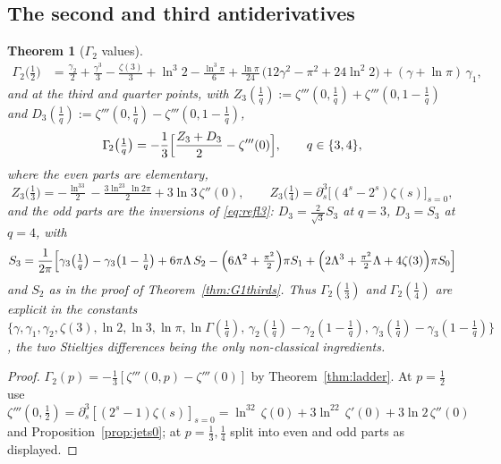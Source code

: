\documentclass[11pt]{article}
\newtheorem{theorem}{Theorem}[section]
\theoremstyle{remark}
\begin{document}
\subsection{The second and third antiderivatives}

\begin{theorem}[$\Gamma_{\!2}$ values]\label{thm:G2}
\begin{align*}
\Gamma_{\!2}\bigl(\tfrac12\bigr)
&=\frac{\gamma_{2}}{2}+\frac{\gamma^{3}}{3}-\frac{\zeta(3)}{3}+\ln ^{3}2
-\frac{\ln ^{3}\pi}{6}
+\frac{\ln \pi}{24}\,\bigl(12 \gamma^{2}-\pi^{2}+24 \ln ^{2}2\bigr)
+(\gamma+\ln \pi)\,\gamma_{1},
\end{align*}
and at the third and quarter points, with
$Z_3(\tfrac1q):=\zeta'''(0,\tfrac1q)+\zeta'''(0,1-\tfrac1q)$ and
$D_3(\tfrac1q):=\zeta'''(0,\tfrac1q)-\zeta'''(0,1-\tfrac1q)$,
\[
\Gamma_{\!2}\bigl(\tfrac1q\bigr)
=-\frac13\Bigl[\frac{Z_3+D_3}{2}-\zeta'''(0)\Bigr],
\qquad q\in\{3,4\},
\]
where the even parts are elementary,
\[
Z_3\bigl(\tfrac13\bigr)=-\tfrac{\ln^33}{2}-\tfrac{3\ln^23\,\ln2\pi}{2}+3\ln3\,\zeta''(0),
\qquad
Z_3\bigl(\tfrac14\bigr)=\partial_s^3\bigl[(4^s-2^s)\zeta(s)\bigr]_{s=0},
\]
and the odd parts are the inversions of \eqref{eq:refl3}:
$D_3=\frac{2}{\sqrt3}S_3$ at $q=3$, $D_3=S_3$ at $q=4$, with
\[
S_3=\frac{1}{2\pi}\Bigl[\gamma_3\bigl(\tfrac1q\bigr)-\gamma_3\bigl(1-\tfrac1q\bigr)
+6\pi \Lambda\,S_2-\Bigl(6\Lambda^2+\tfrac{\pi^2}{2}\Bigr)\pi S_1
+\Bigl(2\Lambda^3+\tfrac{\pi^2}{2}\Lambda+4\zeta(3)\Bigr)\pi S_0\Bigr]
\]
and $S_2$ as in the proof of Theorem~\ref{thm:G1thirds}. Thus
$\Gamma_{\!2}(\tfrac13)$ and $\Gamma_{\!2}(\tfrac14)$ are explicit in the
constants
$\bigl\{\gamma,\gamma_1,\gamma_2,\zeta(3),\ln2,\ln3,\ln\pi,
\ln\Gamma(\tfrac1q),\,
\gamma_2(\tfrac1q)-\gamma_2(1-\tfrac1q),\,
\gamma_3(\tfrac1q)-\gamma_3(1-\tfrac1q)\bigr\}$,
the two Stieltjes differences being the only non-classical ingredients.
\end{theorem}

\begin{proof}
$\Gamma_{\!2}(p)=-\tfrac13[\zeta'''(0,p)-\zeta'''(0)]$ by
Theorem~\ref{thm:ladder}. At $p=\tfrac12$ use
$\zeta'''(0,\tfrac12)=\partial_s^3[(2^s-1)\zeta(s)]_{s=0}
=\ln^32\,\zeta(0)+3\ln^22\,\zeta'(0)+3\ln2\,\zeta''(0)$ and
Proposition~\ref{prop:jets0}; at $p=\tfrac13,\tfrac14$ split into even and
odd parts as displayed.
\end{proof}
\end{document}
